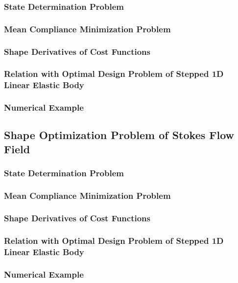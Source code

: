 \documentclass[oneside]{book}
\numberwithin{equation}{section}
\begin{document}
\subsubsection{State Determination Problem}

\subsubsection{Mean Compliance Minimization Problem}

\subsubsection{Shape Derivatives of Cost Functions}

\subsubsection{Relation with Optimal Design Problem of Stepped 1D Linear Elastic Body}

\subsubsection{Numerical Example}

\subsection{Shape Optimization Problem of Stokes Flow Field}

\subsubsection{State Determination Problem}

\subsubsection{Mean Compliance Minimization Problem}

\subsubsection{Shape Derivatives of Cost Functions}

\subsubsection{Relation with Optimal Design Problem of Stepped 1D Linear Elastic Body}

\subsubsection{Numerical Example}
\end{document}
